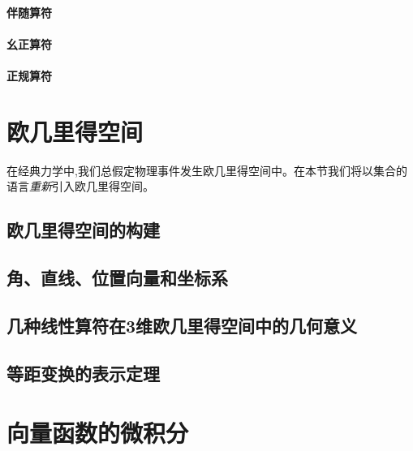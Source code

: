 \documentclass[zihao=-4,linespread=1.5,a4paper,heading=true,twoside]{ctexbook}
\theoremstyle{definition}
\theoremstyle{plain}
\begin{document}
\subsubsection{伴随算符}\label{sec:II.2.4.2_adjoint}

\subsubsection{幺正算符}\label{sec:II.2.4.2_unitary}

\subsubsection{正规算符}\label{sec:II.2.4.2_normal}




\chapter{欧几里得空间}\label{sec:II.3}
在经典力学中,我们总假定物理事件发生欧几里得空间中。在本节我们将以集合的语言\emph{重新}引入欧几里得空间。
\section{欧几里得空间的构建}\label{sec:II.3.1}


\section{角、直线、位置向量和坐标系}\label{sec:II.3.2}


\section{几种线性算符在3维欧几里得空间中的几何意义}\label{sec:II.3.3}


\section{等距变换的表示定理}\label{sec:II.3.4}




\chapter{向量函数的微积分}\label{sec:II.4}
\end{document}
